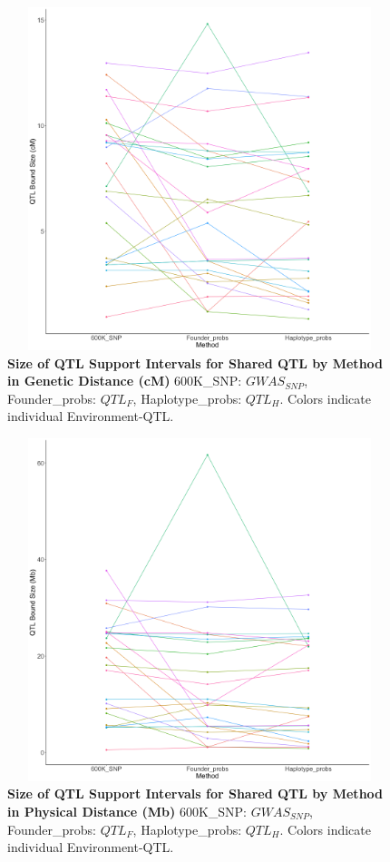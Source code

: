 \documentclass[9pt,twocolumn,twoside]{gsag3jnl}
\begin{document}
\begin{figure}[ht]
\centering
\includegraphics[width=16cm,height=10cm]{figures/support_interval_cM.png}
\caption{\textbf{Size of QTL Support Intervals for Shared QTL by Method in Genetic Distance (cM)} 600K\_SNP: $GWAS_{SNP}$, Founder\_probs: $QTL_F$, Haplotype\_probs: $QTL_H$. Colors indicate individual Environment-QTL.}
\label{fig:supfigure15}
\end{figure}

\begin{figure}[ht]
\centering
\includegraphics[width=16cm,height=10cm]{figures/support_interval_Mb.png}
\caption{\textbf{Size of QTL Support Intervals for Shared QTL by Method in Physical Distance (Mb)} 600K\_SNP: $GWAS_{SNP}$, Founder\_probs: $QTL_F$, Haplotype\_probs: $QTL_H$. Colors indicate individual Environment-QTL.}
\label{fig:supfigure16}
\end{figure}
\end{document}

